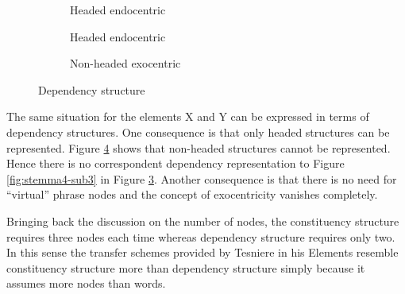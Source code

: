     \begin{figure}[!ht]
        \centering
        \begin{subfigure}{.33\textwidth}
            \centering
            \caption{Headed endocentric}
            \label{fig:stemma5-sub1}
        \end{subfigure}%
        \begin{subfigure}{.33\textwidth}
            \centering
            \caption{Headed endocentric}
            \label{fig:stemma5-sub2}
        \end{subfigure}
        \begin{subfigure}{.33\textwidth}
            \centering
            \caption{Non-headed exocentric}
            \label{fig:stemma5-sub3}
        \end{subfigure}
        \caption{Dependency structure}
        \label{fig:stemma5}
    \end{figure}
    
    The same situation for the elements X and Y can be expressed in terms of dependency structures. One consequence is that only headed structures can be represented. Figure \ref{fig:stemma5} shows that non-headed structures cannot be represented. Hence there is no correspondent dependency representation to Figure \ref{fig:stemma4-sub3} in Figure \ref{fig:stemma5-sub3}. Another consequence is that there is no need for ``virtual'' phrase nodes and the concept of exocentricity vanishes completely.
    
    Bringing back the discussion on the number of nodes, the constituency structure requires three nodes each time whereas dependency structure requires only two. In this sense the transfer schemes provided by Tesniere in his Elements \citep{Tesniere59} resemble constituency structure more than dependency structure simply because it assumes more nodes than words. 

